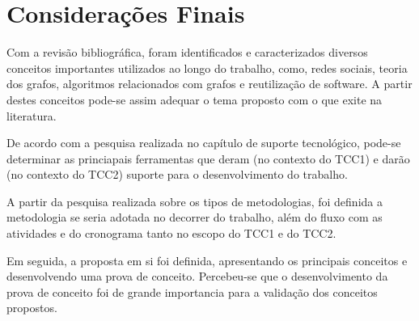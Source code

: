 \chapter{Considerações Finais}

Com a revisão bibliográfica, foram identificados e caracterizados diversos conceitos importantes utilizados ao longo do trabalho, como, redes sociais, teoria dos grafos, algoritmos relacionados com grafos e reutilização de software. A partir destes conceitos pode-se assim adequar o tema proposto com o que exite na literatura.

 De acordo com a pesquisa realizada no capítulo de suporte tecnológico, pode-se determinar as princiapais ferramentas que deram (no contexto do TCC1) e darão (no contexto do TCC2) suporte para o desenvolvimento do trabalho.

 A partir da pesquisa realizada sobre os tipos de metodologias, foi definida a metodologia se seria adotada no decorrer do trabalho, além do fluxo com as atividades e do cronograma tanto no escopo do TCC1 e do TCC2.

 Em seguida, a proposta em si foi definida, apresentando os principais conceitos e desenvolvendo uma prova de conceito. Percebeu-se que o desenvolvimento da prova de conceito foi de grande importancia para a validação dos conceitos propostos.